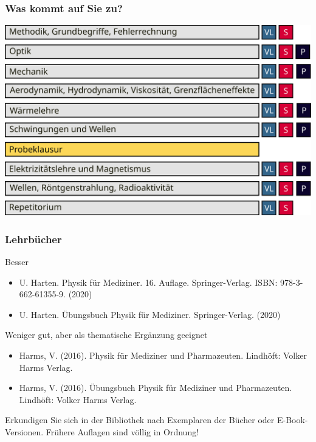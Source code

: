 \documentclass{beamer}
\begin{document}
\begin{frame}
\frametitle{Was kommt auf Sie zu?}

\begin{center}
    \includegraphics[width=\textwidth]{physik_module.png}
\end{center}

\end{frame}

 \begin{frame}
\frametitle{Lehrbücher}

\begin{block}{Besser}
\begin{itemize}
    \item 
    U. Harten. Physik für Mediziner.  16. Auflage. Springer-Verlag. ISBN: 978-3-662-61355-9. (2020)
\item
U. Harten. Übungsbuch Physik für Mediziner. Springer-Verlag. (2020)
\end{itemize}
\end{block}



\begin{block}{Weniger gut, aber als thematische Ergänzung geeignet}
\begin{itemize}
    \item 
Harms, V. (2016). Physik für Mediziner und Pharmazeuten. Lindhöft: Volker Harms Verlag. 
\item
Harms, V. (2016). Übungsbuch Physik für Mediziner und Pharmazeuten. Lindhöft: Volker Harms Verlag. 
\end{itemize}
\end{block}


Erkundigen Sie sich in der Bibliothek nach Exemplaren der Bücher oder E-Book-Versionen. Frühere Auflagen sind völlig in Ordnung! 

\end{frame}
\end{document}
